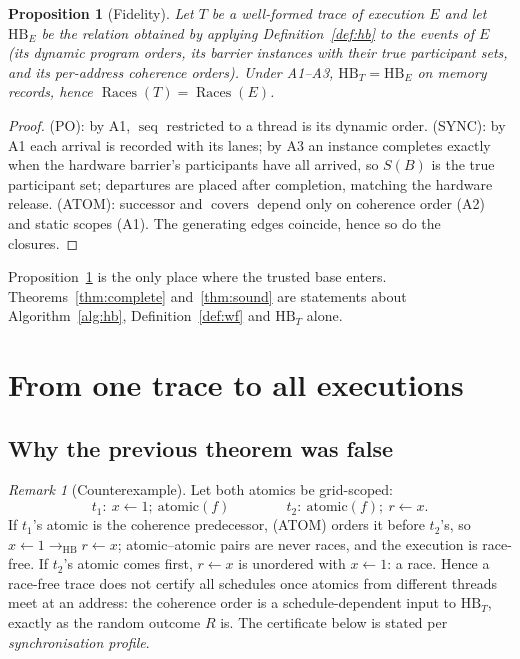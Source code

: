 \documentclass[11pt]{article}
\newtheorem{proposition}[theorem]{Proposition}
\theoremstyle{remark}
\newtheorem{remark}[theorem]{Remark}
\DeclareMathOperator{\seq}{seq}
\DeclareMathOperator{\Races}{Races}
\DeclareMathOperator{\covers}{covers}
\newcommand{\HB}{\to_{\mathrm{HB}}}
\begin{document}
\begin{proposition}[Fidelity]\label{prop:fidelity}
Let $T$ be a well-formed trace of execution $E$ and let $\mathrm{HB}_E$ be the
relation obtained by applying Definition~\ref{def:hb} to the events of $E$
(its dynamic program orders, its barrier instances with their true participant
sets, and its per-address coherence orders). Under A1--A3,
$\mathrm{HB}_T=\mathrm{HB}_E$ on memory records, hence
$\Races(T)=\Races(E)$.
\end{proposition}
\begin{proof}
(PO): by A1, $\seq$ restricted to a thread is its dynamic order.
(SYNC): by A1 each arrival is recorded with its lanes; by A3 an instance
completes exactly when the hardware barrier's participants have all arrived,
so $S(B)$ is the true participant set; departures are placed after
completion, matching the hardware release. (ATOM): successor and $\covers$
depend only on coherence order (A2) and static scopes (A1). The generating
edges coincide, hence so do the closures.
\end{proof}

Proposition~\ref{prop:fidelity} is the only place where the trusted base
enters. Theorems~\ref{thm:complete} and~\ref{thm:sound} are statements about
Algorithm~\ref{alg:hb}, Definition~\ref{def:wf} and $\mathrm{HB}_T$ alone.

\section{From one trace to all executions}\label{sec:cert}

\subsection{Why the previous theorem was false}

\begin{remark}[Counterexample]\label{ex:atomic}
Let both atomics be grid-scoped:
\[
t_1:\ x\gets 1;\ \mathrm{atomic}(f)\qquad\qquad
t_2:\ \mathrm{atomic}(f);\ r\gets x .
\]
If $t_1$'s atomic is the coherence predecessor, (ATOM) orders it before
$t_2$'s, so $x\gets1\HB r\gets x$; atomic--atomic pairs are never races, and
the execution is race-free. If $t_2$'s atomic comes first, $r\gets x$ is
unordered with $x\gets 1$: a race. Hence a race-free trace does not certify all
schedules once atomics from different threads meet at an address: the
coherence order is a schedule-dependent input to $\mathrm{HB}_T$, exactly as
the random outcome $R$ is. The certificate below is stated per
\emph{synchronisation profile}.
\end{remark}
\end{document}
